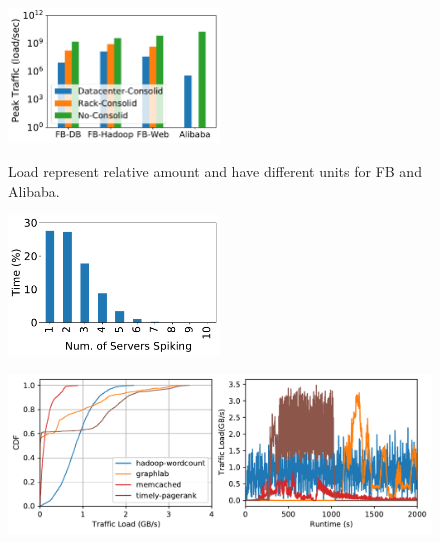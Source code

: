 {
\begin{figure}[t]
\begin{center}
\centerline{\includegraphics[width=0.5\textwidth]{snic/Figures/fig_fb_alibaba_trace.pdf}}
{
Load represent relative amount and have different units for FB and Alibaba.
}
\end{center}
\end{figure}
}
{
\begin{figure}[h]
\begin{center}
\centerline{\includegraphics[width=0.5\textwidth]{snic/Figures/spike-trace-analysis.pdf}}
{
}
\end{center}
\end{figure}
}
{
\begin{figure}[h]
\begin{center}
\centerline{\includegraphics[width=\textwidth]{snic/Figures/fig-osdi16-net-trace.pdf}}
{
}
\end{center}
\end{figure}
}

